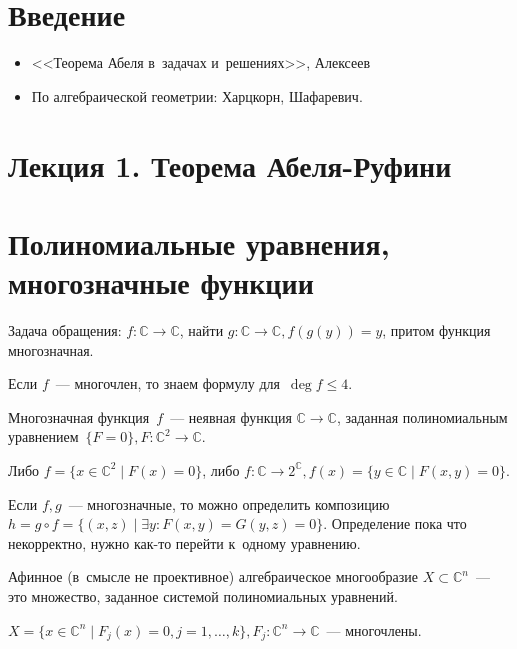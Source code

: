 \documentclass{article}
\begin{document}
\section{Введение}

\begin{itemize}
	\item <<Теорема Абеля в~задачах и~решениях>>, Алексеев
	\item По алгебраической геометрии: Харцкорн, Шафаревич.
\end{itemize}

\section*{Лекция 1. Теорема Абеля-Руфини}

\resetcntrs

\section{Полиномиальные уравнения, многозначные функции}

Задача обращения: $f: \mathbb{C} \rightarrow \mathbb{C}$, найти $g: \mathbb{C}
\rightarrow \mathbb{C}, f(g(y)) = y$, притом функция многозначная.

Если $f$~--- многочлен, то знаем формулу для~$\deg f \le 4$.

\begin{definition}
	Многозначная функция~$f$~--- неявная функция $\mathbb{C} \rightarrow
	\mathbb{C}$, заданная полиномиальным уравнением~$\{F = 0\}, F: \mathbb{C}^2
	\rightarrow \mathbb{C}$.

	Либо $f = \{ x \in \mathbb{C}^2 \mid F(x) = 0\}$, либо $f: \mathbb{C}
	\rightarrow 2^\mathbb{C}, f(x) = \{y \in \mathbb{C} \mid F(x, y) = 0\}$.
\end{definition}

Если $f, g$~--- многозначные, то можно определить композицию~$h = g \circ f =
\{ (x, z) \mid \exists y: F(x, y) = G(y, z) = 0\}$. Определение пока что
некорректно, нужно как-то перейти к~одному уравнению.

\begin{definition}
	Афинное (в~смысле не проективное) алгебраическое многообразие $X \subset
	\mathbb{C}^n$~--- это множество, заданное системой полиномиальных уравнений.

	$X = \{ x \in \mathbb{C}^n \mid F_j(x) = 0, j = 1, \ldots, k\}, F_j:
	\mathbb{C}^n \rightarrow \mathbb{C}$~--- многочлены.
\end{definition}
\end{document}
